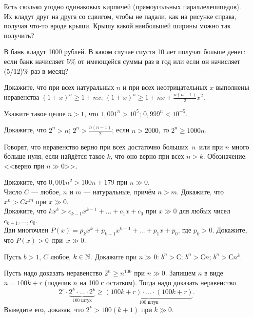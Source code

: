 \documentclass[a4paper,12pt]{article}
\begin{document}
Есть сколько угодно одинаковых
кирпичей (прямоугольных параллелепипедов). %
Их кладут друг на друга со сдвигом, чтобы не падали, как на рисунке справа, получая что-то вроде крыши. %
Крышу какой наибольшей ширины можно так получить?



\vspace*{-5pt}
\vspace*{-7pt}


В банк кладут 1000 рублей. В каком случае спустя 10 лет %
получат больше денег: если банк начисляет 5\% от имеющейся суммы раз
в год или если он начисляет (5/12)\% раз в месяц?


Докажите, что при всех натуральных $n$ и при всех неотрицательных $x$
выполнены неравенства
 $(1+x)^n\ge 1+nx$;
 $(1+x)^n\ge 1+nx+\frac{n(n-1)}{2}x^2.$

 Укажите такое целое $n>1$, что
 $1,001^n>10^5$;
 $0,999^n<10^{-5}$.

Докажите, что  $2^n>n$;  $2^n>\frac{n(n-1)}2$;  если $n>2000$, то $2^n\geq1000n$.

Говорят, что неравенство верно
 при всех достаточно больших~$n$\ или
 при $n$ много больше нуля,
если найдётся такое $k$, что оно верно
при всех $n>k$.
Обозначение: <<верно при $n\gg 0$>>.

Докажите, что $0,001n^2>100n+179$ при $n\gg 0$.\\
Число $C$ --- любое, $n$ и $m$ --- натуральные, причём $n>m$.
Докажите, что $x^n>Cx^m$ при $x\gg 0$.\\
Докажите, что $kx^k>c_{k-1}x^{k-1}+\ldots+c_1x+c_0$ при $x\gg 0$ для любых чисел $c_{k-1},\ldots,c_0$.\\
Дан многочлен $P(x)=p_k x^k+p_{k-1}x^{k-1}+\ldots+p_1x+p_0$,
где $p_k>0$. Докажите, что $P(x)>0$~при~$x\gg 0$.



Пусть $b>1$, $C$ любое, $k\in\mathbb{N}$.
Докажите при $n\gg0$:  $b^n>С$;  $b^n>Сn$;  $b^n>Сn^k$.

Пусть надо доказать неравенство $2^n\geq n^{100}$ при $n\gg0$. Запишем $n$ в виде $n=100k+r$ (поделив $n$ на 100 с остатком). Тогда надо доказать неравенство
$$2^r\cdot\underbrace{2^k\cdot\ldots\cdot2^k}_{100  \text{ штук}}\geq\underbrace{(100k+r)\cdot\ldots\cdot(100k+r)}_{100  \text{ штук}}.$$
Выведите его, доказав, что $2^k>100(k+1)$ при $k\gg0$.
\end{document}
